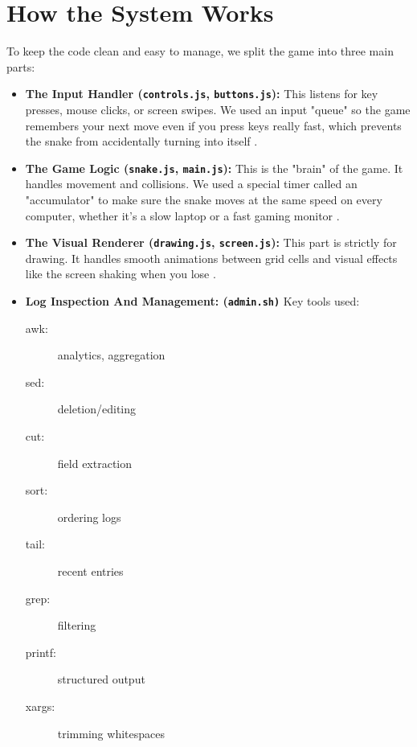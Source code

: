 \section{How the System Works}
To keep the code clean and easy to manage, we split the game into three main parts:
\begin{itemize}
    \item \textbf{The Input Handler (\texttt{controls.js}, \texttt{buttons.js}):} This listens for key presses, mouse clicks, or screen swipes. We used an input "queue" so the game remembers your next move even if you press keys really fast, which prevents the snake from accidentally turning into itself .
    \item \textbf{The Game Logic (\texttt{snake.js}, \texttt{main.js}):} This is the "brain" of the game. It handles movement and collisions. We used a special timer called an "accumulator" to make sure the snake moves at the same speed on every computer, whether it's a slow laptop or a fast gaming monitor .
    \item \textbf{The Visual Renderer (\texttt{drawing.js}, \texttt{screen.js}):} This part is strictly for drawing. It handles smooth animations between grid cells and visual effects like the screen shaking when you lose .
    \item \textbf{Log Inspection And Management: (\texttt{admin.sh)}} Key tools used:
    \begin{description}
        \item[awk: ]  analytics, aggregation 
        \item[sed: ]  deletion/editing
        \item[cut: ]  field extraction
       \item[sort: ]   ordering logs
       \item[tail: ]  recent entries
       \item[grep: ]  filtering
       \item[printf: ]  structured output
       \item[xargs: ] trimming whitespaces
    \end{description}
\end{itemize}

